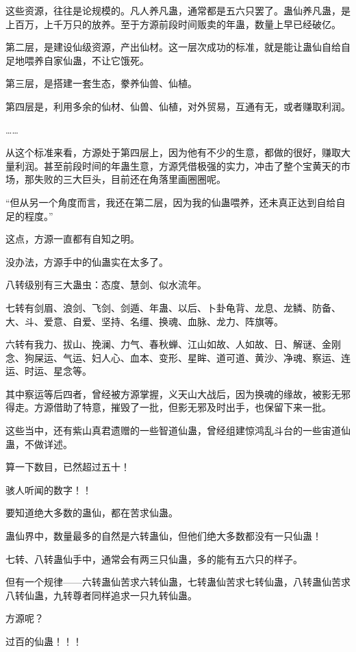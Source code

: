 \begin{this_body}
这些资源，往往是论规模的。凡人养凡蛊，通常都是五六只罢了。蛊仙养凡蛊，是上百万，上千万只的放养。至于方源前段时间贩卖的年蛊，数量上早已经破亿。

第二层，是建设仙级资源，产出仙材。这一层次成功的标准，就是能让蛊仙自给自足地喂养自家仙蛊，不让它饿死。

第三层，是搭建一套生态，豢养仙兽、仙植。

第四层是，利用多余的仙材、仙兽、仙植，对外贸易，互通有无，或者赚取利润。

……

从这个标准来看，方源处于第四层上，因为他有不少的生意，都做的很好，赚取大量利润。甚至前段时间的年蛊生意，方源凭借极强的实力，冲击了整个宝黄天的市场，那失败的三大巨头，目前还在角落里画圈圈呢。

“但从另一个角度而言，我还在第二层，因为我的仙蛊喂养，还未真正达到自给自足的程度。”

这点，方源一直都有自知之明。

没办法，方源手中的仙蛊实在太多了。

八转级别有三大蛊虫：态度、慧剑、似水流年。

七转有剑眉、浪剑、飞剑、剑遁、年蛊、以后、卜卦龟背、龙息、龙鳞、防备、大、斗、爱意、自爱、坚持、名缰、换魂、血脉、龙力、阵旗等。

六转有我力、拔山、挽澜、力气、春秋蝉、江山如故、人如故、日、解谜、金刚念、狗屎运、气运、妇人心、血本、变形、星眸、道可道、黄沙、净魂、察运、连运、时运、星念等。

其中察运等后四者，曾经被方源掌握，义天山大战后，因为换魂的缘故，被影无邪得走。方源借助了特意，摧毁了一批，但影无邪及时出手，也保留下来一批。

这些当中，还有紫山真君遗赠的一些智道仙蛊，曾经组建惊鸿乱斗台的一些宙道仙蛊，不做详述。

算一下数目，已然超过五十！

骇人听闻的数字！！

要知道绝大多数的蛊仙，都在苦求仙蛊。

蛊仙界中，数量最多的自然是六转蛊仙，但他们绝大多数都没有一只仙蛊！

七转、八转蛊仙手中，通常会有两三只仙蛊，多的能有五六只的样子。

但有一个规律——六转蛊仙苦求六转仙蛊，七转蛊仙苦求七转仙蛊，八转蛊仙苦求八转仙蛊，九转尊者同样追求一只九转仙蛊。

方源呢？

过百的仙蛊！！！


\end{this_body}
